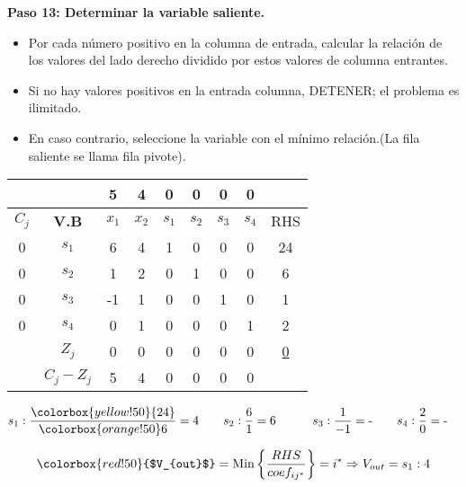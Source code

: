 \documentclass{templateNote}
\begin{document}
\textbf{Paso 13: Determinar la variable saliente.}
\begin{itemize}
    \item Por cada número positivo en la columna de entrada, calcular la relación de los valores del lado derecho dividido por estos valores de columna entrantes.
    \item Si no hay valores positivos en la entrada columna, DETENER; el problema es ilimitado.
    \item En caso contrario, seleccione la variable con el mínimo relación.(La fila saliente se llama fila pivote).
\end{itemize}
\begin{center}
    \begin{tabular}{|c|c|c|c|c|c|c|c|c|}
        \hline
        & & 5 & 4 & 0 & 0 & 0 & 0 & \\ \hline
        $C_j$ & \textbf{V.B} & $x_1$ & $x_2$ & $s_1$ & $s_2$ & $s_3$ & $s_4$ & RHS \\ \hline
        0 & $s_1$ & \cellcolor{orange!50}6 & 4 & 1 & 0 & 0 & 0 & \cellcolor{yellow!50}24 \\ \hline
        0 & $s_2$ & 1 & 2 & 0 & 1 & 0 & 0 & 6 \\ \hline
        0 & $s_3$ & -1 & 1 & 0 & 0 & 1 & 0 & 1 \\ \hline
        0 & $s_4$ & 0 & 1 & 0 & 0 & 0 & 1 & 2 \\ \hline
        & $Z_j$ & 0 & 0 & 0 & 0 & 0 & 0 & \underline{0} \\ \hline
        & $C_j - Z_j$ & 5 & 4 & 0 & 0 & 0 & 0 & \\ \hline
    \end{tabular}
\end{center}
\begin{align*}
    s_1: \frac{\colorbox{yellow!50}{24}}{\colorbox{orange!50}6} = 4 \qquad & s_2: \frac{6}{1} = 6 \qquad & s_3: \frac{1}{-1} = \text{-} \qquad & s_4: \frac{2}{0} = \text{-}
\end{align*}
\begin{center}
    \begin{equation*}
        \colorbox{red!50}{$V_{out}$} = \text{Min} \left\{ \frac{RHS}{coef_{ij^*}} \right\} = i^* \Rightarrow V_{out} = s_1 : 4
    \end{equation*}
\end{center}
\end{document}
